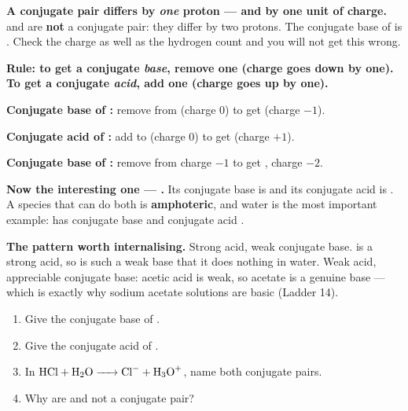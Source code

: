 \documentclass{apchem-worksheet}
\begin{document}
\begin{apctrap}
\textbf{A conjugate pair differs by \emph{one} proton --- and by one
unit of charge.}  and  are \textbf{not} a
conjugate pair: they differ by two protons. The conjugate base of
 is . Check the charge as well as the hydrogen
count and you will not get this wrong.
\end{apctrap}

\begin{workedexample}
\textbf{Rule: to get a conjugate \emph{base}, remove one 
(charge goes down by one). To get a conjugate \emph{acid}, add one
 (charge goes up by one).}

\textbf{Conjugate base of :} remove  from 
(charge 0) to get  (charge $-1$). \checkmark

\textbf{Conjugate acid of :} add  to  (charge 0)
to get  (charge $+1$). \checkmark

\textbf{Conjugate base of :} remove  from charge
$-1$ to get , charge $-2$. \checkmark

\textbf{Now the interesting one --- .} Its conjugate base is
 and its conjugate acid is . A species that can do
both is \textbf{amphoteric}, and water is the most important example:
 has conjugate base  and conjugate acid .

\textbf{The pattern worth internalising.} Strong acid, weak conjugate
base.  is a strong acid, so  is such a weak base that it
does nothing in water. Weak acid, appreciable conjugate base: acetic
acid is weak, so acetate is a genuine base --- which is exactly why
sodium acetate solutions are basic (Ladder 14).
\end{workedexample}

\begin{yourturn}
\begin{enumerate}[leftmargin=*,itemsep=0.5em]
  \item Give the conjugate base of . \workspace[1.4cm]
  \item Give the conjugate acid of . \workspace[1.4cm]
  \item In $\ce{HCl + H2O -> Cl- + H3O+}$, name both conjugate pairs.
        \workspace[1.8cm]
  \item Why are  and  not a conjugate pair?
        \workspace[1.6cm]
\end{enumerate}
\end{yourturn}
\end{document}
